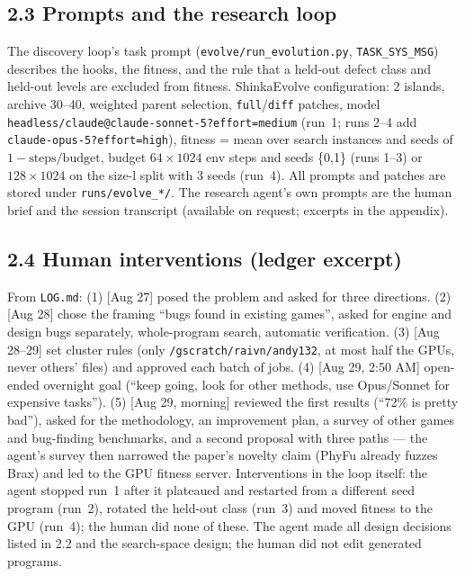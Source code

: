 \subsection*{2.3 Prompts and the research loop}
The discovery loop's task prompt (\texttt{evolve/run\_evolution.py}, \texttt{TASK\_SYS\_MSG}) describes the hooks, the fitness,
and the rule that a held-out defect class and held-out levels are excluded from fitness. ShinkaEvolve configuration:
2 islands, archive 30--40, weighted parent selection, \texttt{full}/\texttt{diff} patches, model
\texttt{headless/claude@claude-sonnet-5?effort=medium} (run~1; runs 2--4 add \texttt{claude-opus-5?effort=high}), fitness = mean over search
instances and seeds of $1-\text{steps}/\text{budget}$, budget $64\times1024$ env steps and seeds \{0,1\} (runs 1--3) or $128\times1024$ on the
size-l split with 3 seeds (run~4). All prompts and patches are stored under \texttt{runs/evolve\_*/}. The research
agent's own prompts are the human brief and the session transcript (available on request; excerpts in the appendix).

\subsection*{2.4 Human interventions (ledger excerpt)}
From \texttt{LOG.md}: (1) [Aug 27] posed the problem and asked for three directions. (2) [Aug 28] chose the framing
``bugs found in existing games'', asked for engine and design bugs separately, whole-program search, automatic verification.
(3) [Aug 28--29] set cluster rules (only \texttt{/gscratch/raivn/andy132}, at most half the GPUs, never others' files) and approved
each batch of jobs. (4) [Aug 29, 2:50 AM] open-ended overnight goal (``keep going, look for other methods, use Opus/Sonnet for expensive tasks'').
(5) [Aug 29, morning] reviewed the first results (``72\% is pretty bad''), asked for the methodology, an improvement plan, a survey of other
games and bug-finding benchmarks, and a second proposal with three paths --- the agent's survey then narrowed the paper's novelty claim
(PhyFu already fuzzes Brax) and led to the GPU fitness server. Interventions in the loop itself: the agent stopped run~1 after it
plateaued and restarted from a different seed program (run~2), rotated the held-out class (run~3) and moved fitness to the GPU (run~4);
the human did none of these. The agent made all design decisions listed in 2.2 and the search-space design; the human did not edit
generated programs.

